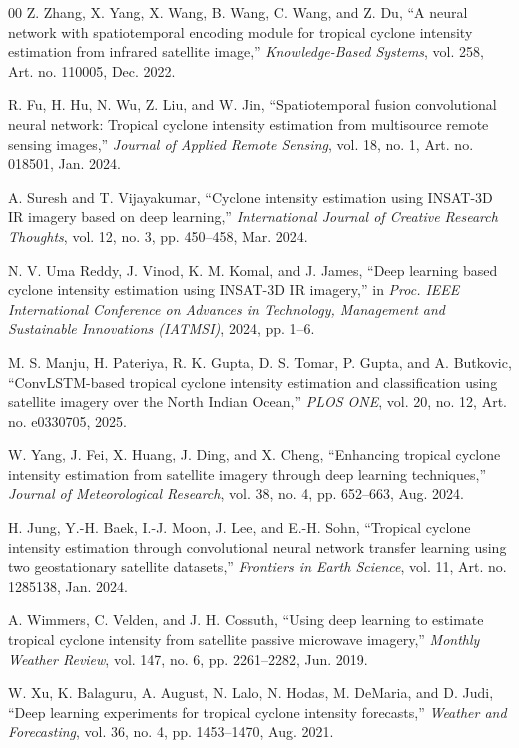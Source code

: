 \documentclass[conference]{IEEEtran}
\begin{document}
\begin{thebibliography}{00}
Z. Zhang, X. Yang, X. Wang, B. Wang, C. Wang, and Z. Du,
``A neural network with spatiotemporal encoding module for tropical cyclone intensity estimation from infrared satellite image,''
\textit{Knowledge-Based Systems}, vol. 258, Art. no. 110005, Dec. 2022.

R. Fu, H. Hu, N. Wu, Z. Liu, and W. Jin,
``Spatiotemporal fusion convolutional neural network: Tropical cyclone intensity estimation from multisource remote sensing images,''
\textit{Journal of Applied Remote Sensing}, vol. 18, no. 1, Art. no. 018501, Jan. 2024.

A. Suresh and T. Vijayakumar,
``Cyclone intensity estimation using INSAT-3D IR imagery based on deep learning,''
\textit{International Journal of Creative Research Thoughts}, vol. 12, no. 3, pp. 450--458, Mar. 2024.

N. V. Uma Reddy, J. Vinod, K. M. Komal, and J. James,
``Deep learning based cyclone intensity estimation using INSAT-3D IR imagery,''
in \textit{Proc. IEEE International Conference on Advances in Technology, Management and Sustainable Innovations (IATMSI)}, 2024, pp. 1--6.

M. S. Manju, H. Pateriya, R. K. Gupta, D. S. Tomar, P. Gupta, and A. Butkovic,
``ConvLSTM-based tropical cyclone intensity estimation and classification using satellite imagery over the North Indian Ocean,''
\textit{PLOS ONE}, vol. 20, no. 12, Art. no. e0330705, 2025.

W. Yang, J. Fei, X. Huang, J. Ding, and X. Cheng,
``Enhancing tropical cyclone intensity estimation from satellite imagery through deep learning techniques,''
\textit{Journal of Meteorological Research}, vol. 38, no. 4, pp. 652--663, Aug. 2024.

H. Jung, Y.-H. Baek, I.-J. Moon, J. Lee, and E.-H. Sohn,
``Tropical cyclone intensity estimation through convolutional neural network transfer learning using two geostationary satellite datasets,''
\textit{Frontiers in Earth Science}, vol. 11, Art. no. 1285138, Jan. 2024.

A. Wimmers, C. Velden, and J. H. Cossuth,
``Using deep learning to estimate tropical cyclone intensity from satellite passive microwave imagery,''
\textit{Monthly Weather Review}, vol. 147, no. 6, pp. 2261--2282, Jun. 2019.

W. Xu, K. Balaguru, A. August, N. Lalo, N. Hodas, M. DeMaria, and D. Judi,
``Deep learning experiments for tropical cyclone intensity forecasts,''
\textit{Weather and Forecasting}, vol. 36, no. 4, pp. 1453--1470, Aug. 2021.


\end{thebibliography}
\end{document}
